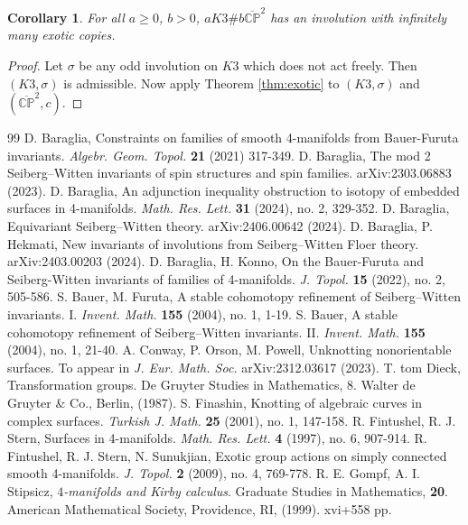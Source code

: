 \documentclass{amsart}
\newtheorem{corollary}[theorem]{Corollary}
\theoremstyle{definition}
\theoremstyle{remark}
\numberwithin{equation}{section}
\begin{document}
\begin{corollary}
For all $a \ge 0$, $b>0$, $aK3 \# b \overline{\mathbb{CP}}^2$ has an involution with infinitely many exotic copies.
\end{corollary}
\begin{proof}
Let $\sigma$ be any odd involution on $K3$ which does not act freely. Then $(K3 , \sigma)$ is admissible. Now apply Theorem \ref{thm:exotic} to $(K3 , \sigma)$ and $(\overline{\mathbb{CP}}^2 , c)$.
\end{proof}




\begin{thebibliography}{99}
D. Baraglia, Constraints on families of smooth 4-manifolds from Bauer-Furuta invariants. {\em Algebr. Geom. Topol.} {\bf 21} (2021) 317-349.
D. Baraglia, The mod 2 Seiberg--Witten invariants of spin structures and spin families. arXiv:2303.06883 (2023).
D. Baraglia, An adjunction inequality obstruction to isotopy of embedded surfaces in 4-manifolds. {\em Math. Res. Lett.} {\bf 31} (2024), no. 2, 329-352.
D. Baraglia, Equivariant Seiberg--Witten theory. arXiv:2406.00642 (2024).
D. Baraglia, P. Hekmati, New invariants of involutions from Seiberg--Witten Floer theory. arXiv:2403.00203 (2024).
D. Baraglia, H. Konno, On the Bauer-Furuta and Seiberg-Witten invariants of families of 4-manifolds. {\em J. Topol.} {\bf 15} (2022), no. 2, 505-586. 
S. Bauer, M. Furuta, A stable cohomotopy refinement of Seiberg--Witten invariants. I. {\em Invent. Math.} {\bf 155} (2004), no. 1, 1-19.
S. Bauer, A stable cohomotopy refinement of Seiberg--Witten invariants. II. {\em Invent. Math.} {\bf 155} (2004), no. 1, 21-40.
A. Conway, P. Orson, M. Powell, Unknotting nonorientable surfaces. To appear in {\em J. Eur. Math. Soc.} arXiv:2312.03617 (2023).
T. tom Dieck, Transformation groups. De Gruyter Studies in Mathematics, 8. Walter de Gruyter \& Co., Berlin, (1987).
S. Finashin, Knotting of algebraic curves in complex surfaces. {\em Turkish J. Math.} {\bf 25} (2001), no. 1, 147-158.
R. Fintushel, R. J. Stern, Surfaces in 4-manifolds. {\em Math. Res. Lett.} {\bf 4} (1997), no. 6, 907-914.
R. Fintushel, R. J. Stern, N. Sunukjian, Exotic group actions on simply connected smooth 4-manifolds. {\em J. Topol.} {\bf 2} (2009), no. 4, 769-778.
R. E. Gompf, A. I. Stipsicz, {\em $4$-manifolds and Kirby calculus}. Graduate Studies in Mathematics, {\bf 20}. American Mathematical Society, Providence, RI, (1999). xvi+558 pp.

\end{thebibliography}
\end{document}

